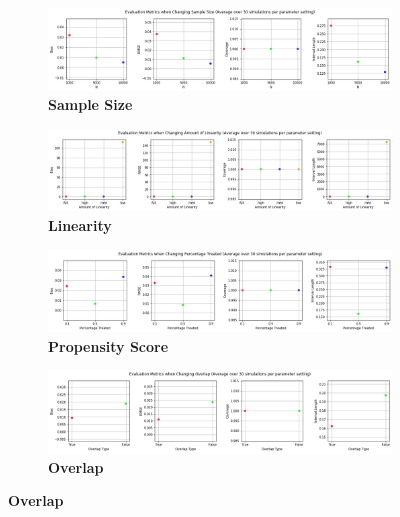 \documentclass[12pt]{article}
\begin{document}
\begin{figure}[!htp]
\caption{Relative Model Performance by Parameter Variation }
	\centering
	\begin{subfigure} [h] {\linewidth}
		\caption{\label{figure:sixa}\textbf{Sample Size}}
   	 	\includegraphics[width = \linewidth]{Graphs/s2_nsiz.png}
	\end{subfigure}
	\begin{subfigure} [h] {\linewidth}
\vspace{0.5cm}
		\caption{\label{figure:sixb}\textbf{Linearity}}
   	 	\includegraphics[width = \linewidth]{Graphs/s2_linear.png}
	\end{subfigure}
	\begin{subfigure} [h] {\linewidth}
\vspace{0.5cm}
		\caption{\label{figure:sixc}\textbf{Propensity Score}}
   	 	\includegraphics[width = \linewidth]{Graphs/s2_propen.png}
	\end{subfigure}
	\begin{subfigure} [h] {\linewidth}
\vspace{0.5cm}
		\caption{\label{figure:sixd}\textbf{Overlap}}
   	 	\includegraphics[width = \linewidth]{Graphs/s2_overlap.png}
	\end{subfigure}
\end{figure} 
\end{document}
